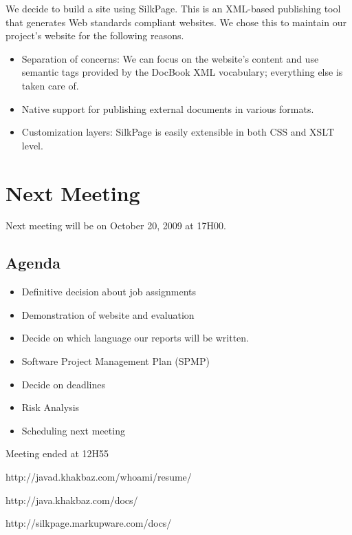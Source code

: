 \documentclass[a4paper, 12pt]{article}
\begin{document}
	We decide to build a site using SilkPage. This is an XML-based publishing tool 
	that generates Web standards compliant websites. 
	We chose this to maintain our project's website for the following reasons.

	\begin{itemize}
		
		\item Separation of concerns: We can focus on the website's content 
		and use semantic tags provided by the DocBook XML vocabulary; 
		everything else is taken care of.
		\item Native support for publishing external documents in various formats.
		\cite{site1} \cite{site2}
		\item Customization layers: SilkPage is easily extensible in both CSS and XSLT level.
		\cite{site3}

	\end{itemize}
	
	\section{Next Meeting}
	
	Next meeting will be on October 20, 2009 at 17H00. 
	
	\subsection{Agenda}
	
	\begin{itemize}
	
		\item Definitive decision about job assignments
		
		\item Demonstration of website and evaluation
		
		\item Decide on which language our reports will be written. 
		
		\item Software Project Management Plan (SPMP)
		
		\item Decide on deadlines
		
		\item Risk Analysis
		
		\item Scheduling next meeting 
		
	\end{itemize}
	
	
	\begin{center}
	 	Meeting ended at 12H55
	\end{center}	
	
	\begin{thebibliography}{99}
		
		http://javad.khakbaz.com/whoami/resume/
		
		http://java.khakbaz.com/docs/
		
		http://silkpage.markupware.com/docs/
		
	\end{thebibliography}	
	
\end{document}
